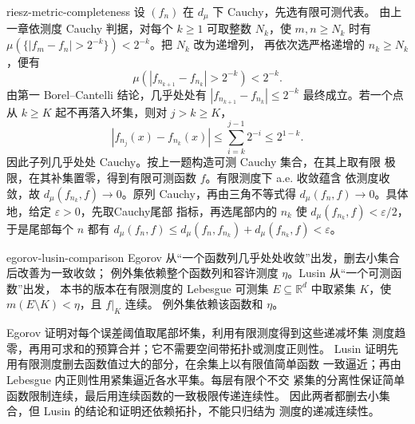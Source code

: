 \begin{solution}{riesz-metric-completeness}
设 \((f_n)\) 在 \(d_\mu\) 下 Cauchy，先选有限可测代表。
由上一章依测度 Cauchy 判据，对每个 \(k\ge1\) 可取整数 \(N_k\)，使
\(m,n\ge N_k\) 时有
\(\mu(\{|f_m-f_n|>2^{-k}\})<2^{-k}\)。把 \(N_k\) 改为递增列，
再依次选严格递增的 \(n_k\ge N_k\)，便有
\[
 \mu(|f_{n_{k+1}}-f_{n_k}|>2^{-k})<2^{-k}.
\]
由第一 Borel--Cantelli 结论，几乎处处有
\(|f_{n_{k+1}}-f_{n_k}|\le2^{-k}\) 最终成立。若一个点从 \(k\ge K\)
起不再落入坏集，则对 \(j>k\ge K\)，
\[
 |f_{n_j}(x)-f_{n_k}(x)|\le\sum_{i=k}^{j-1}2^{-i}
 \le2^{1-k}.
\]
因此子列几乎处处 Cauchy。按上一题构造可测 Cauchy 集合，在其上取有限
极限，在其补集置零，得到有限可测函数 \(f\)。有限测度下 a.e. 收敛蕴含
依测度收敛，故
\(d_\mu(f_{n_k},f)\to0\)。原列 Cauchy，再由三角不等式得
\(d_\mu(f_n,f)\to0\)。具体地，给定 \(\varepsilon>0\)，先取Cauchy尾部
指标，再选尾部内的 \(n_k\) 使 \(d_\mu(f_{n_k},f)<\varepsilon/2\)，
于是尾部每个 \(n\) 都有
\(d_\mu(f_n,f)\le d_\mu(f_n,f_{n_k})+d_\mu(f_{n_k},f)<\varepsilon\)。
\end{solution}

\begin{solution}{egorov-lusin-comparison}
Egorov 从“一个函数列几乎处处收敛”出发，删去小集合后改善为一致收敛；
例外集依赖整个函数列和容许测度 \(\eta\)。Lusin 从“一个可测函数”出发，
本书的版本在有限测度的 Lebesgue 可测集 \(E\subseteq\mathbb R^d\)
中取紧集 \(K\)，使 \(m(E\setminus K)<\eta\)，且 \(f|_K\) 连续。
例外集依赖该函数和 \(\eta\)。

Egorov 证明对每个误差阈值取尾部坏集，利用有限测度得到这些递减坏集
测度趋零，再用可求和的预算合并；它不需要空间带拓扑或测度正则性。
Lusin 证明先用有限测度删去函数值过大的部分，在余集上以有限值简单函数
一致逼近；再由 Lebesgue 内正则性用紧集逼近各水平集。每层有限个不交
紧集的分离性保证简单函数限制连续，最后用连续函数的一致极限传递连续性。
因此两者都删去小集合，但 Lusin 的结论和证明还依赖拓扑，不能只归结为
测度的递减连续性。
\end{solution}
